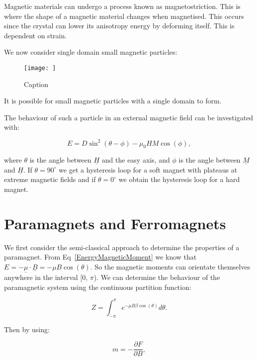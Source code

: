 Magnetic materials can undergo a process known as magnetostriction. This is where the shape of a magnetic material changes when magnetised. This occurs since the crystal can lower its anisotropy energy by deforming itself. This is dependent on strain.

\noindent We now consider single domain small magnetic particles:

\begin{figure}
    \centering
    \texttt{[image: ]}
    \caption{Caption}
    \label{fig:enter-label}
\end{figure}

\noindent It is possible for small magnetic particles with a single domain to form.

\noindent The behaviour of such a particle in an external magnetic field can be investigated with:

\begin{equation}
    E = D\sin^2(\theta - \phi) - \mu_0 H M \cos(\phi),
    \label{SingleDomainMagneticParticleEnergy}
\end{equation}

\noindent where $\theta$ is the angle between $\underline{H}$ and the easy axis, and $\phi$ is the angle between $\underline{M}$ and $\underline{H}$. If $\theta = 90^\circ$ we get a hysteresis loop for a soft magnet with plateaus at extreme magnetic fields and if $\theta = 0^\circ$ we obtain the hysteresis loop for a hard magnet.

\section{Paramagnets and Ferromagnets}

We first consider the semi-classical approach to determine the properties of a paramagnet. From Eq~\ref{EnergyMagneticMoment} we know that $E = -\underline{\mu} \cdot \underline{B} = -\mu B \cos(\theta)$. So the magnetic moments can orientate themselves anywhere in the interval [0, $\pi$).
We can determine the behaviour of the paramagnetic system using the continuous partition function:

\begin{equation}
    Z = \int^\pi_{-\pi} e^{-\mu B \beta \cos(\theta)} d\theta.
    \label{SemiClassicalPartitionFunction}
\end{equation}

\noindent Then by using:

\begin{equation}
    m = - \frac{\partial F}{\partial B},
    \label{MagneticMomentPerSpin}
\end{equation}


